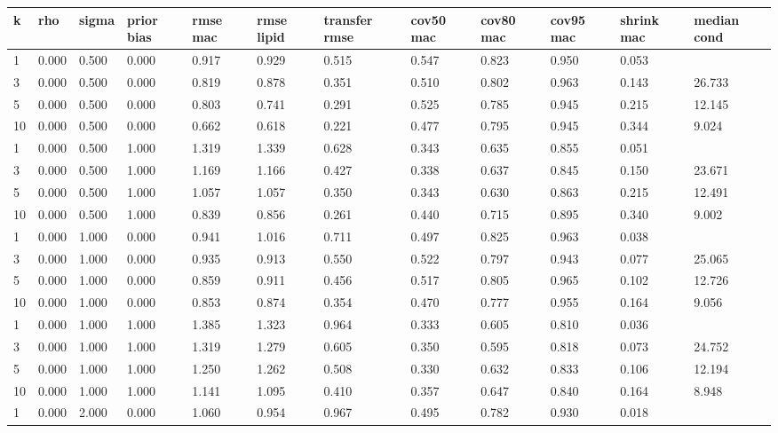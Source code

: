 {\footnotesize\setlength{\tabcolsep}{3pt}
\begin{longtable}{llllllllllll}
\toprule
\textbf{k} & \textbf{rho} & \textbf{sigma} & \textbf{prior bias} & \textbf{rmse mac} & \textbf{rmse lipid} & \textbf{transfer rmse} & \textbf{cov50 mac} & \textbf{cov80 mac} & \textbf{cov95 mac} & \textbf{shrink mac} & \textbf{median cond} \\
\midrule
\endhead
1 & 0.000 & 0.500 & 0.000 & 0.917 & 0.929 & 0.515 & 0.547 & 0.823 & 0.950 & 0.053 &  \\
3 & 0.000 & 0.500 & 0.000 & 0.819 & 0.878 & 0.351 & 0.510 & 0.802 & 0.963 & 0.143 & 26.733 \\
5 & 0.000 & 0.500 & 0.000 & 0.803 & 0.741 & 0.291 & 0.525 & 0.785 & 0.945 & 0.215 & 12.145 \\
10 & 0.000 & 0.500 & 0.000 & 0.662 & 0.618 & 0.221 & 0.477 & 0.795 & 0.945 & 0.344 & 9.024 \\
1 & 0.000 & 0.500 & 1.000 & 1.319 & 1.339 & 0.628 & 0.343 & 0.635 & 0.855 & 0.051 &  \\
3 & 0.000 & 0.500 & 1.000 & 1.169 & 1.166 & 0.427 & 0.338 & 0.637 & 0.845 & 0.150 & 23.671 \\
5 & 0.000 & 0.500 & 1.000 & 1.057 & 1.057 & 0.350 & 0.343 & 0.630 & 0.863 & 0.215 & 12.491 \\
10 & 0.000 & 0.500 & 1.000 & 0.839 & 0.856 & 0.261 & 0.440 & 0.715 & 0.895 & 0.340 & 9.002 \\
1 & 0.000 & 1.000 & 0.000 & 0.941 & 1.016 & 0.711 & 0.497 & 0.825 & 0.963 & 0.038 &  \\
3 & 0.000 & 1.000 & 0.000 & 0.935 & 0.913 & 0.550 & 0.522 & 0.797 & 0.943 & 0.077 & 25.065 \\
5 & 0.000 & 1.000 & 0.000 & 0.859 & 0.911 & 0.456 & 0.517 & 0.805 & 0.965 & 0.102 & 12.726 \\
10 & 0.000 & 1.000 & 0.000 & 0.853 & 0.874 & 0.354 & 0.470 & 0.777 & 0.955 & 0.164 & 9.056 \\
1 & 0.000 & 1.000 & 1.000 & 1.385 & 1.323 & 0.964 & 0.333 & 0.605 & 0.810 & 0.036 &  \\
3 & 0.000 & 1.000 & 1.000 & 1.319 & 1.279 & 0.605 & 0.350 & 0.595 & 0.818 & 0.073 & 24.752 \\
5 & 0.000 & 1.000 & 1.000 & 1.250 & 1.262 & 0.508 & 0.330 & 0.632 & 0.833 & 0.106 & 12.194 \\
10 & 0.000 & 1.000 & 1.000 & 1.141 & 1.095 & 0.410 & 0.357 & 0.647 & 0.840 & 0.164 & 8.948 \\
1 & 0.000 & 2.000 & 0.000 & 1.060 & 0.954 & 0.967 & 0.495 & 0.782 & 0.930 & 0.018 &  \\

\end{longtable}}

